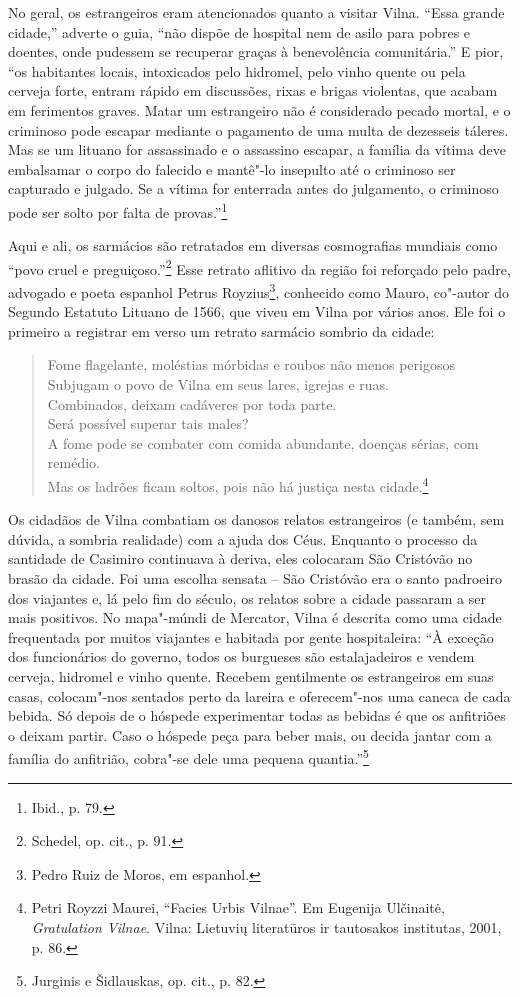 No geral, os estrangeiros eram atencionados quanto a visitar Vilna.
``Essa grande cidade,'' adverte o guia, ``não dispõe de hospital nem de
asilo para pobres e doentes, onde pudessem se recuperar graças à
benevolência comunitária.'' E pior, ``os habitantes locais, intoxicados
pelo hidromel, pelo vinho quente ou pela cerveja forte, entram rápido em
discussões, rixas e brigas violentas, que acabam em ferimentos graves.
Matar um estrangeiro não é considerado pecado mortal, e o criminoso pode
escapar mediante o pagamento de uma multa de dezesseis táleres. Mas se
um lituano for assassinado e o assassino escapar, a família da vítima
deve embalsamar o corpo do falecido e mantê"-lo insepulto até o criminoso
ser capturado e julgado. Se a vítima for enterrada antes do julgamento,
o criminoso pode ser solto por falta de provas.''\footnote{Ibid., p. 79.}

Aqui e ali, os sarmácios são retratados em diversas cosmografias
mundiais como ``povo cruel e preguiçoso.''\footnote{Schedel, op. cit., p. 91.} Esse retrato aflitivo da região foi reforçado pelo padre, advogado e poeta espanhol Petrus Royzius\footnote{Pedro Ruiz de Moros, em espanhol.}, conhecido como Mauro,
co"-autor do Segundo Estatuto Lituano de 1566, que viveu em Vilna por
vários anos. Ele foi o primeiro a registrar em verso um retrato sarmácio
sombrio da cidade:

\begin{verse}
Fome flagelante, moléstias mórbidas e roubos não menos perigosos\\
Subjugam o povo de Vilna em seus lares, igrejas e ruas.\\
Combinados, deixam cadáveres por toda parte.\\
Será possível superar tais males?\\
A fome pode se combater com comida abundante, doenças sérias, com
remédio.\\
Mas os ladrões ficam soltos, pois não há justiça nesta cidade.\footnote{Petri Royzzi Maurei, ``Facies Urbis Vilnae''. Em Eugenija Ulčinaitė, \textit{Gratulation Vilnae}. Vilna: Lietuvių literatūros ir tautosakos institutas, 2001, p. 86.}
\end{verse}

Os cidadãos de Vilna combatiam os danosos relatos estrangeiros (e
também, sem dúvida, a sombria realidade) com a ajuda dos Céus. Enquanto
o processo da santidade de Casimiro continuava à deriva, eles colocaram
São Cristóvão no brasão da cidade. Foi uma escolha sensata -- São
Cristóvão era o santo padroeiro dos viajantes e, lá pelo fim do século,
os relatos sobre a cidade passaram a ser mais positivos. No mapa"-múndi
de Mercator, Vilna é descrita como uma cidade frequentada por muitos
viajantes e habitada por gente hospitaleira: ``À exceção dos
funcionários do governo, todos os burgueses são estalajadeiros e vendem
cerveja, hidromel e vinho quente. Recebem gentilmente os estrangeiros em
suas casas, colocam"-nos sentados perto da lareira e oferecem"-nos uma
caneca de cada bebida. Só depois de o hóspede experimentar todas as
bebidas é que os anfitriões o deixam partir. Caso o hóspede peça para
beber mais, ou decida jantar com a família do anfitrião, cobra"-se dele
uma pequena quantia.''\footnote{Jurginis e Šidlauskas, op. cit., p. 82.}

